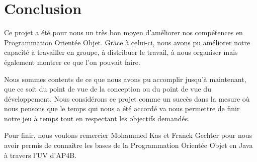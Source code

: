 \newpage
\newpage
\section{Conclusion}

Ce projet a été pour nous un très bon moyen d'améliorer nos compétences en Programmation Orientée Objet. Grâce à celui-ci, nous avons pu améliorer notre capacité à travailler en groupe, à distribuer le travail, à nous organiser mais également montrer ce que l'on pouvait faire.

Nous sommes contents de ce que nous avons pu accomplir jusqu'à maintenant, que ce soit du point de vue de la conception ou du point de vue du développement. Nous considérons ce projet comme un succès dans la mesure où nous pensons que le temps qui nous a été accordé va nous permettre de finir notre jeu à temps tout en respectant les objectifs demandés.

Pour finir, nous voulons remercier Mohammed Kas et Franck Gechter pour nous avoir permis de connaître les bases de la Programmation Orientée Objet en Java à travers l'UV d'AP4B.